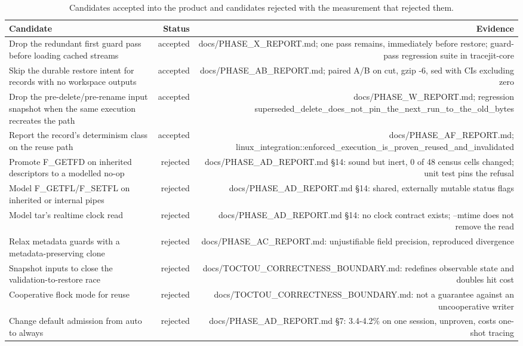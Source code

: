 \begin{table}[t]
\centering
\small
\caption{Candidates accepted into the product and candidates rejected with the measurement that rejected them.}
\label{tab:optimisations}
\begin{tabular}{lrr}
\toprule
\textbf{Candidate} & \textbf{Status} & \textbf{Evidence} \\
\midrule
Drop the redundant first guard pass before loading cached streams & accepted & docs/PHASE\_X\_REPORT.md; one pass remains, immediately before restore; guard-pass regression suite in tracejit-core \\
Skip the durable restore intent for records with no workspace outputs & accepted & docs/PHASE\_AB\_REPORT.md; paired A/B on cut, gzip -6, sed with CIs excluding zero \\
Drop the pre-delete/pre-rename input snapshot when the same execution recreates the path & accepted & docs/PHASE\_W\_REPORT.md; regression superseded\_delete\_does\_not\_pin\_the\_next\_run\_to\_the\_old\_bytes \\
Report the record's determinism class on the reuse path & accepted & docs/PHASE\_AF\_REPORT.md; linux\_integration::enforced\_execution\_is\_proven\_reused\_and\_invalidated \\
Promote F\_GETFD on inherited descriptors to a modelled no-op & rejected & docs/PHASE\_AD\_REPORT.md §14: sound but inert, 0 of 48 census cells changed; unit test pins the refusal \\
Model F\_GETFL/F\_SETFL on inherited or internal pipes & rejected & docs/PHASE\_AD\_REPORT.md §14: shared, externally mutable status flags \\
Model tar's realtime clock read & rejected & docs/PHASE\_AD\_REPORT.md §14: no clock contract exists; --mtime does not remove the read \\
Relax metadata guards with a metadata-preserving clone & rejected & docs/PHASE\_AC\_REPORT.md: unjustifiable field precision, reproduced divergence \\
Snapshot inputs to close the validation-to-restore race & rejected & docs/TOCTOU\_CORRECTNESS\_BOUNDARY.md: redefines observable state and doubles hit cost \\
Cooperative flock mode for reuse & rejected & docs/TOCTOU\_CORRECTNESS\_BOUNDARY.md: not a guarantee against an uncooperative writer \\
Change default admission from auto to always & rejected & docs/PHASE\_AD\_REPORT.md §7: 3.4-4.2\% on one session, unproven, costs one-shot tracing \\

\end{tabular}
\end{table}
